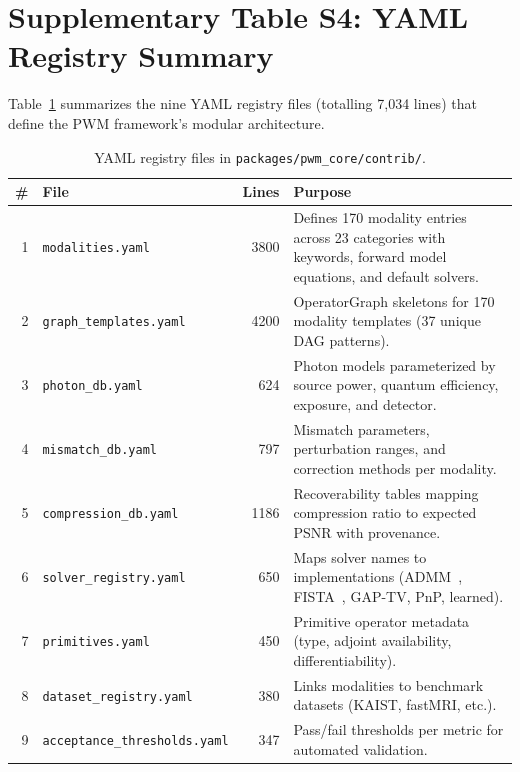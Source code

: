 \documentclass[11pt]{article}
\begin{document}
\newpage

\section{Supplementary Table S4: YAML Registry Summary}
\label{sec:yaml}

Table~\ref{tab:yaml} summarizes the nine YAML registry files (totalling
7,034 lines) that define the PWM framework's modular architecture.

\begin{table}[htbp]
\centering
\caption{YAML registry files in \texttt{packages/pwm\_core/contrib/}.}
\label{tab:yaml}
\begin{tabular}{r l r p{6.5cm}}
\toprule
\textbf{\#} & \textbf{File} & \textbf{Lines} & \textbf{Purpose} \\
\midrule
1 & \texttt{modalities.yaml}           & 3800 & Defines 170 modality entries across 23 categories with keywords, forward model equations, and default solvers. \\
2 & \texttt{graph\_templates.yaml}     & 4200 & OperatorGraph skeletons for 170 modality templates (37 unique DAG patterns). \\
3 & \texttt{photon\_db.yaml}           & 624 & Photon models parameterized by source power, quantum efficiency, exposure, and detector. \\
4 & \texttt{mismatch\_db.yaml}         & 797 & Mismatch parameters, perturbation ranges, and correction methods per modality. \\
5 & \texttt{compression\_db.yaml}      & 1186 & Recoverability tables mapping compression ratio to expected PSNR with provenance. \\
6 & \texttt{solver\_registry.yaml}     & 650 & Maps solver names to implementations (ADMM~\cite{boyd2011admm}, FISTA~\cite{beck2009fista}, GAP-TV, PnP, learned). \\
7 & \texttt{primitives.yaml}           & 450 & Primitive operator metadata (type, adjoint availability, differentiability). \\
8 & \texttt{dataset\_registry.yaml}    & 380 & Links modalities to benchmark datasets (KAIST, fastMRI, etc.). \\
9 & \texttt{acceptance\_thresholds.yaml} & 347 & Pass/fail thresholds per metric for automated validation. \\
\bottomrule
\end{tabular}
\end{table}
\end{document}
